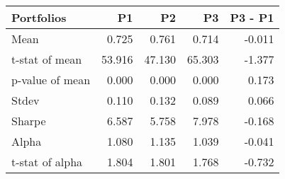 \begin{tabular}{lrrrr}
\toprule
Portfolios & P1 & P2 & P3 & P3 - P1 \\
\midrule
Mean & 0.725 & 0.761 & 0.714 & -0.011 \\
t-stat of mean & 53.916 & 47.130 & 65.303 & -1.377 \\
p-value of mean & 0.000 & 0.000 & 0.000 & 0.173 \\
Stdev & 0.110 & 0.132 & 0.089 & 0.066 \\
Sharpe & 6.587 & 5.758 & 7.978 & -0.168 \\
Alpha & 1.080 & 1.135 & 1.039 & -0.041 \\
t-stat of alpha & 1.804 & 1.801 & 1.768 & -0.732 \\
\bottomrule
\end{tabular}
